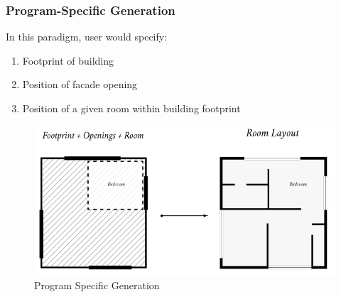                         \subsubsection{Program-Specific Generation}
                                In this paradigm, user would specify: 
                                \begin{enumerate}[label=\alph*.]
                                        \item Footprint of building 
                                        \item Position of facade opening 
                                        \item Position of a given room within building footprint
                                \end{enumerate}
                                \begin{figure}[h]
                                        \centering
                                        \includegraphics[width=1\textwidth]{img/chapter_6/programspecificGeneration.png}
                                        \caption{Program Specific Generation}
                                        \label{fig: Program Specific Generation}
                                \end{figure}
